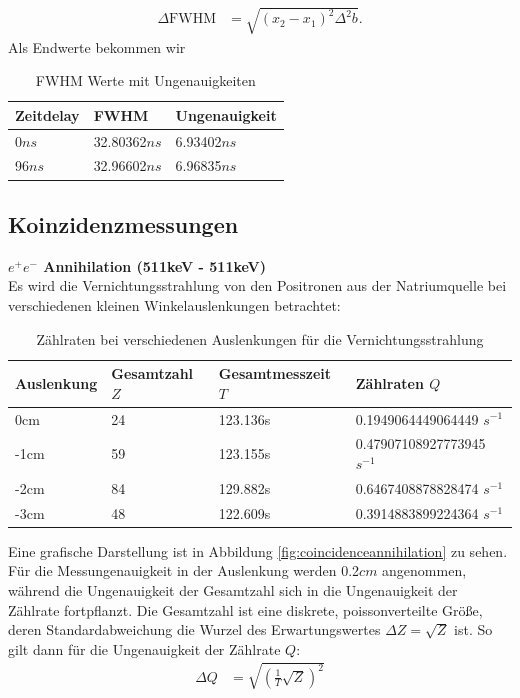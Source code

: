 \documentclass[%
aps,
onecolumn,
11pt,
tightenlines,
nofootinbib,
superscriptaddress,
floatfix,
prd,
]{revtex4-2}
\begin{document}
\begin{align}
	\Delta \text{FWHM} &= \sqrt{ (x_2 - x_1)^2\Delta^2 b }.
\end{align}
Als Endwerte bekommen wir
\begin{table}[H]
	\centering
	\begin{tabular}{lll}
		\toprule
			Zeitdelay & FWHM         & Ungenauigkeit \\
		\midrule
			0$ns$     & 32.80362$ns$ & 6.93402$ns$ \\
		\cline{1-3}
			96$ns$    & 32.96602$ns$ & 6.96835$ns$ \\
		\cline{1-3}
		\bottomrule
	\end{tabular}
	\caption{FWHM Werte mit Ungenauigkeiten}
	\label{tab:fwhm}
\end{table}

\newpage
\subsection{Koinzidenzmessungen}
\noindent \textbf{$e^+e^-$ Annihilation (511keV - 511keV)}\\
	Es wird die Vernichtungsstrahlung von den Positronen aus der Natriumquelle bei verschiedenen kleinen Winkelauslenkungen betrachtet:

\begin{table}[H]
    \centering
    \begin{tabular}{llll}
    \hline
        Auslenkung & Gesamtzahl $Z$ & Gesamtmesszeit $T$ & Zählraten $Q$\\ \hline
        0cm & 24 & 123.136s & 0.1949064449064449 $s^{-1}$ \\ \hline
        -1cm & 59 & 123.155s & 0.47907108927773945 $s^{-1}$ \\ \hline
        -2cm & 84 & 129.882s & 0.6467408878828474 $s^{-1}$ \\ \hline
        -3cm & 48 & 122.609s & 0.3914883899224364 $s^{-1}$ \\ \hline
    \end{tabular}
	\caption{Zählraten bei verschiedenen Auslenkungen für die Vernichtungsstrahlung}
	\label{tab:coincidenceannihilation}
\end{table}

Eine grafische Darstellung ist in Abbildung \ref{fig:coincidenceannihilation} zu sehen. Für die Messungenauigkeit in der Auslenkung werden 0.2$cm$ angenommen, während die Ungenauigkeit der Gesamtzahl sich in die Ungenauigkeit der Zählrate fortpflanzt. Die Gesamtzahl ist eine diskrete, poissonverteilte Größe, deren Standardabweichung die Wurzel des Erwartungswertes $\Delta Z = \sqrt{Z}$ ist. So gilt dann für die Ungenauigkeit der Zählrate $Q$:
\begin{align}
	\Delta Q &= \sqrt{ \left( \frac{1}{T}\sqrt{Z}  \right)^2  }
\end{align}
\end{document}
